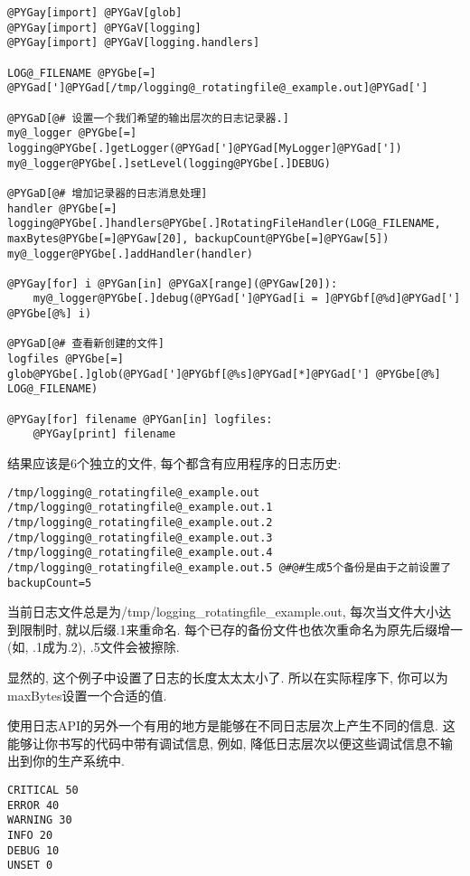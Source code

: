 \documentclass[a4paper,10pt,english]{manual}
\begin{document}
\begin{Verbatim}[commandchars=@\[\]]
@PYGay[import] @PYGaV[glob]
@PYGay[import] @PYGaV[logging]
@PYGay[import] @PYGaV[logging.handlers]

LOG@_FILENAME @PYGbe[=] @PYGad[']@PYGad[/tmp/logging@_rotatingfile@_example.out]@PYGad[']

@PYGaD[@# 设置一个我们希望的输出层次的日志记录器.]
my@_logger @PYGbe[=] logging@PYGbe[.]getLogger(@PYGad[']@PYGad[MyLogger]@PYGad['])
my@_logger@PYGbe[.]setLevel(logging@PYGbe[.]DEBUG)

@PYGaD[@# 增加记录器的日志消息处理]
handler @PYGbe[=] logging@PYGbe[.]handlers@PYGbe[.]RotatingFileHandler(LOG@_FILENAME, maxBytes@PYGbe[=]@PYGaw[20], backupCount@PYGbe[=]@PYGaw[5])
my@_logger@PYGbe[.]addHandler(handler)

@PYGay[for] i @PYGan[in] @PYGaX[range](@PYGaw[20]):
    my@_logger@PYGbe[.]debug(@PYGad[']@PYGad[i = ]@PYGbf[@%d]@PYGad['] @PYGbe[@%] i)

@PYGaD[@# 查看新创建的文件]
logfiles @PYGbe[=] glob@PYGbe[.]glob(@PYGad[']@PYGbf[@%s]@PYGad[*]@PYGad['] @PYGbe[@%] LOG@_FILENAME)

@PYGay[for] filename @PYGan[in] logfiles:
    @PYGay[print] filename
\end{Verbatim}

结果应该是6个独立的文件, 每个都含有应用程序的日志历史:

\begin{Verbatim}[commandchars=@\[\]]
/tmp/logging@_rotatingfile@_example.out
/tmp/logging@_rotatingfile@_example.out.1
/tmp/logging@_rotatingfile@_example.out.2
/tmp/logging@_rotatingfile@_example.out.3
/tmp/logging@_rotatingfile@_example.out.4
/tmp/logging@_rotatingfile@_example.out.5 @#@#生成5个备份是由于之前设置了backupCount=5
\end{Verbatim}

当前日志文件总是为/tmp/logging\_rotatingfile\_example.out, 每次当文件大小达到限制时, 就以后缀.1来重命名. 每个已存的备份文件也依次重命名为原先后缀增一(如, .1成为.2), .5文件会被擦除.

显然的, 这个例子中设置了日志的长度太太太小了. 所以在实际程序下, 你可以为maxBytes设置一个合适的值.

使用日志API的另外一个有用的地方是能够在不同日志层次上产生不同的信息. 这能够让你书写的代码中带有调试信息, 例如, 降低日志层次以便这些调试信息不输出到你的生产系统中.

\begin{Verbatim}[commandchars=@\[\]]
CRITICAL 50
ERROR 40
WARNING 30
INFO 20
DEBUG 10
UNSET 0
\end{Verbatim}
\end{document}
